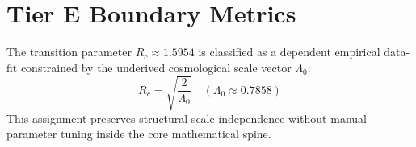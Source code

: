 \documentclass[11pt,twocolumn]{article}
\begin{document}
\section{Tier E Boundary Metrics}
The transition parameter $R_c \approx 1.5954$ is classified as a dependent empirical data-fit constrained by the underived cosmological scale vector $\Lambda_0$:
\begin{equation}
R_c = \sqrt{\frac{2}{\Lambda_0}} \quad (\Lambda_0 \approx 0.7858)
\end{equation}
This assignment preserves structural scale-independence without manual parameter tuning inside the core mathematical spine.


\end{document}

